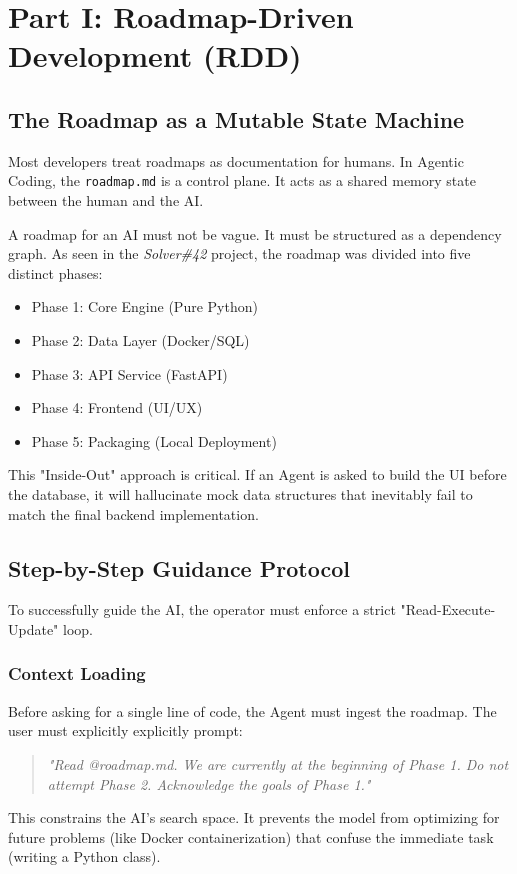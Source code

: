 \documentclass[12pt, a4paper]{article}
\begin{document}
\section{Part I: Roadmap-Driven Development (RDD)}

\subsection{The Roadmap as a Mutable State Machine}

Most developers treat roadmaps as documentation for humans. In Agentic Coding, the \texttt{roadmap.md} is a control plane. It acts as a shared memory state between the human and the AI.

A roadmap for an AI must not be vague. It must be structured as a dependency graph. As seen in the \textit{Solver\#42} project, the roadmap was divided into five distinct phases:
\begin{itemize}
    \item Phase 1: Core Engine (Pure Python)
    \item Phase 2: Data Layer (Docker/SQL)
    \item Phase 3: API Service (FastAPI)
    \item Phase 4: Frontend (UI/UX)
    \item Phase 5: Packaging (Local Deployment)
\end{itemize}

This "Inside-Out" approach is critical. If an Agent is asked to build the UI before the database, it will hallucinate mock data structures that inevitably fail to match the final backend implementation.

\subsection{Step-by-Step Guidance Protocol}

To successfully guide the AI, the operator must enforce a strict "Read-Execute-Update" loop.

\subsubsection{Context Loading}
Before asking for a single line of code, the Agent must ingest the roadmap. The user must explicitly explicitly prompt:
\begin{quote}
    \textit{"Read @roadmap.md. We are currently at the beginning of Phase 1. Do not attempt Phase 2. Acknowledge the goals of Phase 1."}
\end{quote}
This constrains the AI's search space. It prevents the model from optimizing for future problems (like Docker containerization) that confuse the immediate task (writing a Python class).
\end{document}
